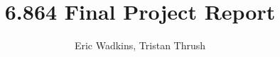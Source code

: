 \documentclass[12pt]{article}
\begin{document}
\title{\textbf{6.864 Final Project Report}}
\author{Eric Wadkins, Tristan Thrush}
\maketitle

	\begin{center}

\end{center}
\end{document}
